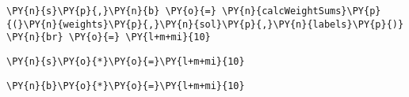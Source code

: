 
{\par%
\vspace{-1\baselineskip}%
}%
\begin{notebookcell}[]%
\begin{addmargin}[\cellleftmargin]{0em}%
{\smaller%
\par%
%
\vspace{-1\smallerfontscale}%
\begin{Verbatim}[commandchars=\\\{\}]
\PY{n}{s}\PY{p}{,}\PY{n}{b} \PY{o}{=} \PY{n}{calcWeightSums}\PY{p}{(}\PY{n}{weights}\PY{p}{,}\PY{n}{sol}\PY{p}{,}\PY{n}{labels}\PY{p}{)}
\PY{n}{br} \PY{o}{=} \PY{l+m+mi}{10}
\end{Verbatim}
%
\par%
\vspace{-1\smallerfontscale}}%
\end{addmargin}
\end{notebookcell}



{\par%
\vspace{-1\baselineskip}%
}%
\begin{notebookcell}[]%
\begin{addmargin}[\cellleftmargin]{0em}%
{\smaller%
\par%
%
\vspace{-1\smallerfontscale}%
\begin{Verbatim}[commandchars=\\\{\}]
\PY{n}{s}\PY{o}{*}\PY{o}{=}\PY{l+m+mi}{10}
\end{Verbatim}
%
\par%
\vspace{-1\smallerfontscale}}%
\end{addmargin}
\end{notebookcell}



{\par%
\vspace{-1\baselineskip}%
}%
\begin{notebookcell}[]%
\begin{addmargin}[\cellleftmargin]{0em}%
{\smaller%
\par%
%
\vspace{-1\smallerfontscale}%
\begin{Verbatim}[commandchars=\\\{\}]
\PY{n}{b}\PY{o}{*}\PY{o}{=}\PY{l+m+mi}{10}
\end{Verbatim}
%
\par%
\vspace{-1\smallerfontscale}}%
\end{addmargin}
\end{notebookcell}


